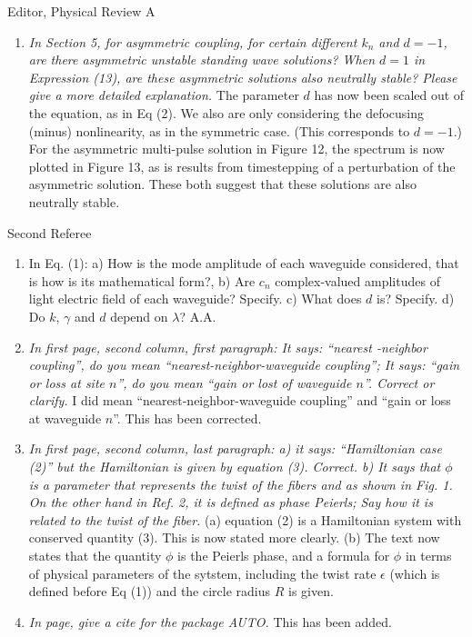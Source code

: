 \documentclass[11pt]{letter}
\begin{document}
\begin{letter}{Editor, Physical Review A}
\begin{enumerate}
\item \emph{In Section 5, for asymmetric coupling, for certain different $k_{n}$ and $d=-1$, are there asymmetric unstable standing wave solutions? When $d=1$ in Expression (13), are these asymmetric solutions also neutrally stable? Please give a more detailed explanation.} The parameter $d$ has now been scaled out of the equation, as in Eq (2). We also are only considering the defocusing (minus) nonlinearity, as in the symmetric case. (This corresponds to $d=-1$.) For the asymmetric multi-pulse solution in Figure 12, the spectrum is now plotted in Figure 13, as is results from timestepping of a perturbation of the asymmetric solution. These both suggest that these solutions are also neutrally stable.

\end{enumerate}

Second Referee
\begin{enumerate}
\item In Eq. (1): a) How is the mode amplitude of each waveguide considered, that is how is its mathematical form?, b) Are $c_n$ complex-valued amplitudes of light electric field of each waveguide? Specify. c) What does $d$ is? Specify. d) Do $k$, $\gamma$ and $d$ depend on $\lambda$? A.A.

\item \emph{In first page, second column, first paragraph: It says: ``nearest -neighbor coupling'', do you mean ``nearest-neighbor-waveguide coupling''; It says: ``gain or loss at site $n$'', do you mean ``gain or lost of waveguide $n$''. Correct or clarify.} I did mean ``nearest-neighbor-waveguide coupling'' and ``gain or loss at waveguide $n$''. This has been corrected.

\item \emph{In first page, second column, last paragraph: a) it says: ``Hamiltonian case (2)'' but the Hamiltonian is given by equation (3). Correct. b) It says that $\phi$ is a parameter that represents the twist of the fibers and as shown in Fig. 1. On the other hand in Ref. 2, it is defined as phase Peierls; Say how it is related to the twist of the fiber.} (a) equation (2) is a Hamiltonian system with conserved quantity (3). This is now stated more clearly. (b) The text now states that the quantity $\phi$ is the Peierls phase, and a formula for $\phi$ in terms of physical parameters of the sytstem, including the twist rate $\epsilon$ (which is defined before Eq (1)) and the circle radius $R$ is given.

\item \emph{In page, give a cite for the package AUTO.} This has been added.


\end{enumerate}
\end{letter}
\end{document}
